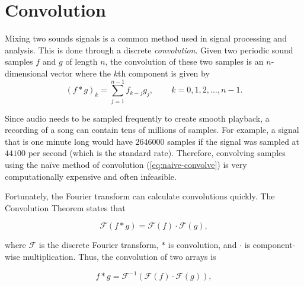 
\section*{Convolution} %

Mixing two sounds signals is a common method used in signal processing and analysis. 
This is done through a discrete \emph{convolution}. 
Given two periodic sound samples $f$ and $g$ of length $n$, the convolution of these two samples is an $n$-dimensional vector where the $k$th component is given by
\begin{equation}
(f \ast g)_k = \sum_{j=1}^{n-1} f_{k-j}g_j,\,\,\,\,\,\,\,\,\,\,\,\,\,k = 0,1,2,\dots,n-1. %
\label{eq:naive-convolve}
\end{equation}

Since audio needs to be sampled frequently to create smooth playback, a recording of a song can contain tens of millions of samples. 
For example, a signal that is one minute long would have $2646000$ samples if the signal was sampled at $44100$ per second (which is the standard rate).
Therefore, convolving samples using the na\"ive method of convolution (\ref{eq:naive-convolve}) is very computationally expensive and often infeasible. 

Fortunately, the Fourier transform can calculate convolutions quickly. 
The Convolution Theorem states that 

\begin{equation}
\mathcal{F}(f \ast g) = \mathcal{F}(f)\cdot\mathcal{F}(g), 
\end{equation}

where $\mathcal{F}$ is the discrete Fourier transform, $\ast$ is convolution, and $\cdot$ is component-wise multiplication.
Thus, the convolution of two arrays is 

\begin{equation}
f \ast g = \mathcal{F}^{-1}(\mathcal{F}(f)\cdot\mathcal{F}(g)),
\end{equation}

